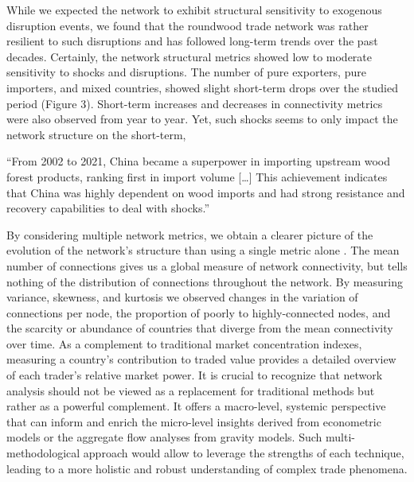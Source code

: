 \documentclass[
  authoryear,
  review,
  3p]{elsarticle}
\begin{document}
While we expected the network to exhibit structural sensitivity to
exogenous disruption events, we found that the roundwood trade network
was rather resilient to such disruptions and has followed long-term
trends over the past decades. Certainly, the network structural metrics
showed low to moderate sensitivity to shocks and disruptions. The number
of pure exporters, pure importers, and mixed countries, showed slight
short-term drops over the studied period (Figure 3). Short-term
increases and decreases in connectivity metrics were also observed from
year to year. Yet, such shocks seems to only impact the network
structure on the short-term,

``From 2002 to 2021, China became a superpower in importing upstream
wood forest products, ranking first in import volume {[}\ldots{]} This
achievement indicates that China was highly dependent on wood imports
and had strong resistance and recovery capabilities to deal with
shocks.''

By considering multiple network metrics, we obtain a clearer picture of
the evolution of the network's structure than using a single metric
alone \citep{shanafelt_-it-yourself_2017, salau_taking_2022}. The mean
number of connections gives us a global measure of network connectivity,
but tells nothing of the distribution of connections throughout the
network. By measuring variance, skewness, and kurtosis we observed
changes in the variation of connections per node, the proportion of
poorly to highly-connected nodes, and the scarcity or abundance of
countries that diverge from the mean connectivity over time. As a
complement to traditional market concentration indexes, measuring a
country's contribution to traded value provides a detailed overview of
each trader's relative market power. It is crucial to recognize that
network analysis should not be viewed as a replacement for traditional
methods but rather as a powerful complement. It offers a macro-level,
systemic perspective that can inform and enrich the micro-level insights
derived from econometric models or the aggregate flow analyses from
gravity models. Such multi-methodological approach would allow to
leverage the strengths of each technique, leading to a more holistic and
robust understanding of complex trade phenomena.
\end{document}
